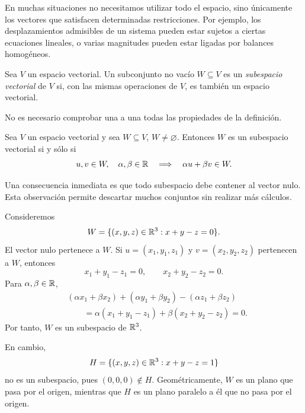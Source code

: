 En muchas situaciones no necesitamos utilizar todo el espacio, sino únicamente los vectores que satisfacen determinadas restricciones. Por ejemplo, los desplazamientos admisibles de un sistema pueden estar sujetos a ciertas ecuaciones lineales, o varias magnitudes pueden estar ligadas por balances homogéneos.

\begin{definition}
Sea $V$ un espacio vectorial. Un subconjunto no vacío $W\subseteq V$ es un \emph{subespacio vectorial} de $V$ si, con las mismas operaciones de $V$, es también un espacio vectorial.
\end{definition}

No es necesario comprobar una a una todas las propiedades de la definición.

\begin{theorem}
Sea $V$ un espacio vectorial y sea $W\subseteq V$, $W\neq\varnothing$. Entonces $W$ es un subespacio vectorial si y sólo si
\[
u,v\in W,\quad \alpha,\beta\in\mathbb{R}
\quad\Longrightarrow\quad
\alpha u+\beta v\in W.
\]
\end{theorem}

Una consecuencia inmediata es que todo subespacio debe contener al vector nulo. Esta observación permite descartar muchos conjuntos sin realizar más cálculos.

\begin{example}
Consideremos
\[
W=\{(x,y,z)\in\mathbb{R}^3:x+y-z=0\}.
\]
El vector nulo pertenece a $W$. Si $u=(x_1,y_1,z_1)$ y $v=(x_2,y_2,z_2)$ pertenecen a $W$, entonces
\[
x_1+y_1-z_1=0,
\qquad
x_2+y_2-z_2=0.
\]
Para $\alpha,\beta\in\mathbb{R}$,
\[
\begin{aligned}
&(\alpha x_1+\beta x_2)+(\alpha y_1+\beta y_2)
 -(\alpha z_1+\beta z_2)\\
&\qquad=\alpha(x_1+y_1-z_1)+\beta(x_2+y_2-z_2)=0.
\end{aligned}
\]
Por tanto, $W$ es un subespacio de $\mathbb{R}^3$.

En cambio,
\[
H=\{(x,y,z)\in\mathbb{R}^3:x+y-z=1\}
\]
no es un subespacio, pues $(0,0,0)\notin H$. Geométricamente, $W$ es un plano que pasa por el origen, mientras que $H$ es un plano paralelo a él que no pasa por el origen.
\end{example}

